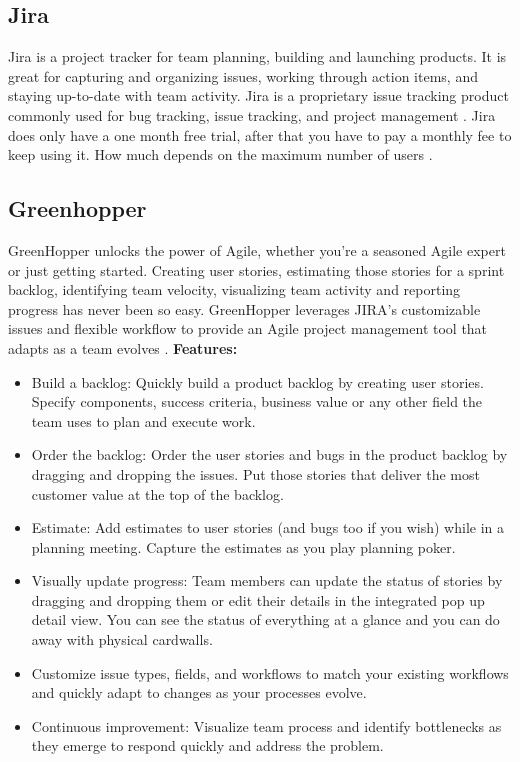 \newpage

\subsection{Jira}
Jira is a project tracker for team planning, building and launching products. It is great for capturing and organizing issues, working through action items, and staying up-to-date with team activity. Jira is a proprietary issue tracking product commonly used for bug tracking, issue tracking, and project management \cite{bib:atlassian}.
\newline
\newline
Jira does only have a one month free trial, after that you have to pay a monthly fee to keep using it. How much depends on the maximum number of users \cite{bib:jira}.

\subsection{Greenhopper}
GreenHopper unlocks the power of Agile, whether you're a seasoned Agile expert or just getting started. Creating user stories, estimating those stories for a sprint backlog, identifying team velocity, visualizing team activity and reporting progress has never been so easy.
\newline
\newline
GreenHopper leverages JIRA's customizable issues and flexible workflow to provide an Agile project management tool that adapts as a team evolves \cite{bib:green}.
\newline
\newline
\textbf{Features:}
\begin{itemize}
\item{}Build a backlog: Quickly build a product backlog by creating user stories. Specify components, success criteria, business value or any other field the team uses to plan and execute work.
\item{}Order the backlog: Order the user stories and bugs in the product backlog by dragging and dropping the issues. Put those stories that deliver the most customer value at the top of the backlog.
\item{}Estimate: Add estimates to user stories (and bugs too if you wish) while in a planning meeting. Capture the estimates as you play planning poker.
\item{}Visually update progress: Team members can update the status of stories by dragging and dropping them or edit their details in the integrated pop up detail view. You can see the status of everything at a glance and you can do away with physical cardwalls.
\item{}Customize issue types, fields, and workflows to match your existing workflows and quickly adapt to changes as your processes evolve.
\item{}Continuous improvement: Visualize team process and identify bottlenecks as they emerge to respond quickly and address the problem.
\end{itemize}

